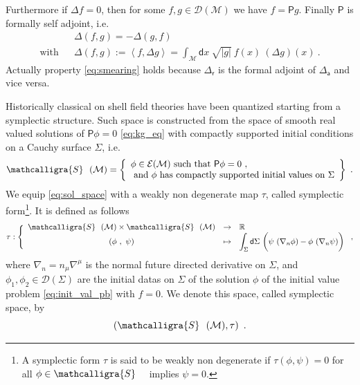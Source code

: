 \documentclass[11pt]{book}
\newcommand{\bigint}{\displaystyle\int}
\newcommand{\abs}[1]{\left|#1\right|}
\newcommand{\sm}[1]{\left\langle#1\right\rangle}
\newcommand{\Dcal}{\mathcal{D}}
\newcommand{\Ecal}{\mathcal{E}}
\newcommand{\Mcal}{\mathcal{M}}
\newcommand{\Rbb}{\mathbb{R}}
\newcommand{\Psf}{\mathsf{P}}
\newcommand{\asf}{\mathsf{a}}
\newcommand{\dsf}{\mathsf{d}}
\newcommand{\rsf}{\mathsf{r}}
\theoremstyle{break}
\begin{document}
Furthermore if $\Delta f = 0$, then for some $f, g\in\Dcal(\Mcal)$ we have $f = \Psf g$. Finally $\Psf$ is formally self adjoint, i.e. 
%
\begin{eqnarray}
&&\Delta(f,g) = - \Delta(g,f) \label{eq:smearing} \\
%
\mbox{with} && \Delta(f,g) := \sm{f,\Delta g} = \int_\Mcal \dsf x \ \sqrt{\abs{g}} \ f(x) \ \left(\Delta g\right)(x) \ . \nonumber
\end{eqnarray}
%
Actually property \eqref{eq:smearing} holds because $\Delta_\rsf$ is the formal adjoint of $\Delta_\asf$ and vice versa.


\bigskip


Historically classical on shell field theories have been quantized starting from a symplectic structure. Such space is constructed from the space of smooth real valued solutions of $\Psf \phi = 0$ \eqref{eq:kg_eq} with compactly supported initial conditions on a Cauchy surface $\Sigma$, i.e.
%
\begin{equation}
\mathcalligra{S} \ \ (\Mcal) = \left\{ 
\begin{array}{l}
\phi \in \Ecal(\Mcal) \mbox{ such that } \Psf\phi=0 \ , \\
\mbox{ and } \phi \mbox{ has compactly supported initial values on } \Sigma 
\end{array}
\right\} \ .
\label{eq:sol_space}
\end{equation}
%
We equip \eqref{eq:sol_space} with a weakly non degenerate map $\tau$, called symplectic form\footnote{A symplectic form $\tau$ is said to be weakly non degenerate if $\tau(\phi,\psi)=0$ for all $\phi\in \mathcalligra{S} \ \ \ $ implies $\psi = 0$.}. It is defined as follows
%
\begin{equation*}
\tau : \Bigg\{
\begin{array}{ccl}
\mathcalligra{S} \ \ (\Mcal) \times \mathcalligra{S} \ \ (\Mcal) & \to & \Rbb \\
(\phi \ , \ \psi) & \mapsto & \bigint_\Sigma  \dsf \Sigma \ \bigg( \psi \ (\nabla_n \phi) - \phi \ (\nabla_n \psi) \bigg)
\end{array}
\ ,
\end{equation*}
%
where $\nabla_n = n_\mu \nabla^\mu$ is the normal future directed derivative on $\Sigma$, and $\phi_1, \phi_2 \in \Dcal(\Sigma)$  are the initial datas on $\Sigma$ of the solution $\phi$ of the initial value problem \eqref{eq:init_val_pb} with $f=0$. We denote this space, called symplectic space, by 
%
\begin{equation*}
\left(\mathcalligra{S} \ \ (\Mcal),\tau\right) \ . 
\end{equation*}
\end{document}

